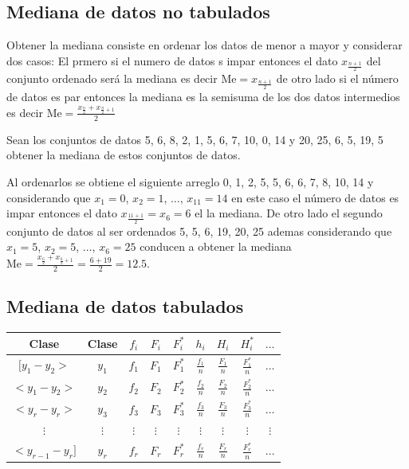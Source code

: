 \documentclass[10pt,]{krantz}
\theoremstyle{definition}
\theoremstyle{definition}
\theoremstyle{definition}
\theoremstyle{remark}
\let\BeginKnitrBlock\begin \let\EndKnitrBlock\end
\begin{document}
\hypertarget{mediana-de-datos-no-tabulados}{%
\subsection{Mediana de datos no tabulados}\label{mediana-de-datos-no-tabulados}}

Obtener la mediana consiste en ordenar los datos de menor a mayor y considerar dos casos: El prmero si el numero de datos s impar entonces el dato \(x_{\frac{n+1}{2}}\) del conjunto ordenado será la mediana es decir \(\text{Me}=x_{\frac{n+1}{2}}\) de otro lado si el número de datos es par entonces la mediana es la semisuma de los dos datos intermedios es decir \(\text{Me}=\frac{x_{\frac{n}{2}}+x_{\frac{n}{2}+1}}{2}\)

\BeginKnitrBlock{exercise}
\protect\hypertarget{exr:unnamed-chunk-11}{}{\label{exr:unnamed-chunk-11} }Sean los conjuntos de datos 5, 6, 8, 2, 1, 5, 6, 7, 10, 0, 14 y 20, 25, 6, 5, 19, 5 obtener la mediana de estos conjuntos de datos.
\EndKnitrBlock{exercise}

\BeginKnitrBlock{solution}
{}Al ordenarlos se obtiene el siguiente arreglo 0, 1, 2, 5, 5, 6, 6, 7, 8, 10, 14 y considerando que \(x_1=0\), \(x_2=1\), \(\ldots\), \(x_{11}=14\) en este caso el número de datos es impar entonces el dato \(x_{\frac{11+1}{2}}=x_{6}=6\) el la mediana. De otro lado el segundo conjunto de datos al ser ordenados 5, 5, 6, 19, 20, 25 ademas considerando que \(x_1=5\), \(x_2=5\), \(\ldots\), \(x_6=25\) conducen a obtener la mediana \(\text{Me}=\frac{x_{\frac{6}{2}}+x_{\frac{6}{2}+1}}{2}=\frac{6+19}{2}=12.5\).
\EndKnitrBlock{solution}

\hypertarget{mediana-de-datos-tabulados}{%
\subsection{Mediana de datos tabulados}\label{mediana-de-datos-tabulados}}

\begin{longtable}[]{@{}ccccccccc@{}}
\toprule
Clase & Clase & \(f_i\) & \(F_i\) & \(F_i^*\) & \(h_i\) & \(H_i\) & \(H_i^*\) & \(\ldots\)\tabularnewline
\midrule
\endhead
\([y_1-y_2>\) & \(y_1\) & \(f_1\) & \(F_1\) & \(F_1^*\) & \(\frac{f_1}{n}\) & \(\frac{F_1}{n}\) & \(\frac{F_1^*}{n}\) & \(\ldots\)\tabularnewline
\(<y_1-y_2>\) & \(y_2\) & \(f_2\) & \(F_2\) & \(F_2^*\) & \(\frac{f_2}{n}\) & \(\frac{F_2}{n}\) & \(\frac{F_2^*}{n}\) & \(\ldots\)\tabularnewline
\(<y_{r}-y_r>\) & \(y_3\) & \(f_3\) & \(F_3\) & \(F_3^*\) & \(\frac{f_3}{n}\) & \(\frac{F_3}{n}\) & \(\frac{F_3^*}{n}\) & \(\ldots\)\tabularnewline
\(\vdots\) & \(\vdots\) & \(\vdots\) & \(\vdots\) & \(\vdots\) & \(\vdots\) & \(\vdots\) & \(\vdots\) & \(\vdots\)\tabularnewline
\(<y_{r-1}-y_r]\) & \(y_r\) & \(f_r\) & \(F_r\) & \(F_r^*\) & \(\frac{f_r}{n}\) & \(\frac{F_r}{n}\) & \(\frac{F_r^*}{n}\) & \(...\)\tabularnewline
\bottomrule
\end{longtable}
\end{document}
